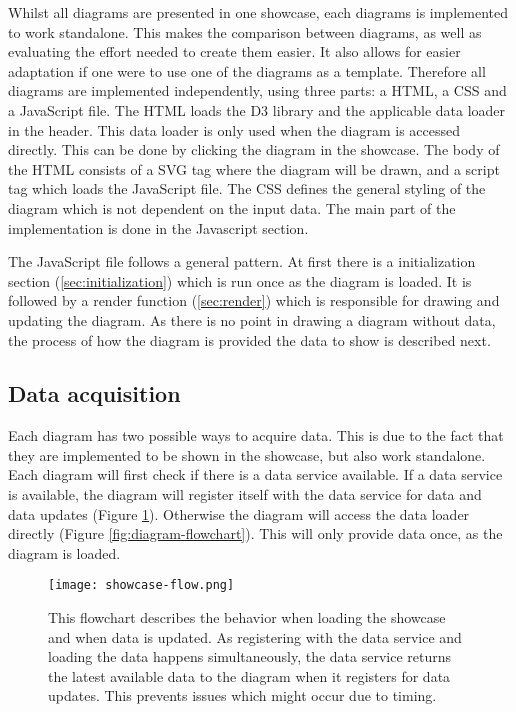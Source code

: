 Whilst all diagrams are presented in one showcase, each diagrams is implemented to work standalone. This makes the comparison between diagrams, as well as evaluating the effort needed to create them easier. It also allows for easier adaptation if one were to use one of the diagrams as a template. Therefore all diagrams are implemented independently, using three parts: a HTML, a CSS and a JavaScript file. The HTML loads the D3 library and the applicable data loader in the header. This data loader is only used when the diagram is accessed directly. This can be done by clicking the diagram in the showcase. The body of the HTML consists of a SVG tag where the diagram will be drawn, and a script tag which loads the JavaScript file. The CSS defines the general styling of the diagram which is not dependent on the input data. The main part of the implementation is done in the Javascript section.

The JavaScript file follows a general pattern. At first there is a initialization section (\ref{sec:initialization}) which is run once as the diagram is loaded. It is followed by a render function (\ref{sec:render}) which is responsible for drawing and updating the diagram. As there is no point in drawing a diagram without data, the process of how the diagram is provided the data to show is described next.

\subsection{Data acquisition} \label{sec:data-acquisition}
Each diagram has two possible ways to acquire data. This is due to the fact that they are implemented to be shown in the showcase, but also work standalone. Each diagram will first check if there is a data service available. If a data service is available, the diagram will register itself with the data service for data and data updates (Figure \ref{fig:showcase-flowchart}). Otherwise the diagram will access the data loader directly (Figure \ref{fig:diagram-flowchart}). This will only provide data once, as the diagram is loaded.

\begin{figure}[ht]
    \texttt{[image: showcase-flow.png]}
    \captionsetup{width=0.9\textwidth}
    \caption[showcase-flowchart]{This flowchart describes the behavior when loading the showcase and when data is updated. As registering with the data service and loading the data happens simultaneously, the data service returns the latest available data to the diagram when it registers for data updates. This prevents issues which might occur due to timing.}
    \label{fig:showcase-flowchart}
\end{figure}

